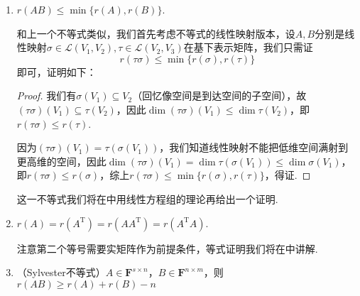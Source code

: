 \begin{enumerate}
\begin{proof}
              下面我们证明$r(A+B)\leqslant r(A)+r(B)$，这里我们站在线性映射的角度证明（接下来第3、5个不等式也是如此，将矩阵的证明转化为线性映射的证明）. 设$A,B$分别是线性映射$\sigma,\tau\in\mathcal{L}(V_1,V_2)$在基下表示矩阵. 事实上，矩阵的秩的定义就来源于线性映射的秩，即$r(A)=r(\sigma)$，$r(B)=r(\tau)$，因此我们只需要证明
              \[r(\sigma+\tau)\leqslant r(\sigma)+r(\tau),\]
              又根据线性映射的秩的定义，只需证明
              \[\dim(\sigma+\tau)(V_1)\leqslant \dim\sigma(V_1)+\dim\tau(V_1),\]
              事实上，$\forall\beta\in(\sigma+\tau)(V_1)$，$\exists\alpha\in V_1$，使得$\beta=(\sigma+\tau)\alpha=\sigma(\alpha)+\tau(\alpha)\in\sigma(V_1)+\tau(V_1)$，因此$(\sigma+\tau)(V_1)\subseteq\sigma(V_1)+\tau(V_1)$，故$\dim(\sigma+\tau)(V_1)\leqslant \dim(\sigma(V_1)+\tau(V_1))\leqslant \dim\sigma(V_1)+\dim\tau(V_1)$，得证（最后一个不等号来源于）.
          \end{proof}

    \item $r(AB) \leqslant \min\{r(A), r(B)\}$.

          和上一个不等式类似，我们首先考虑不等式的线性映射版本，设$A,B$分别是线性映射$\sigma\in\mathcal{L}(V_1,V_2),\tau\in\mathcal{L}(V_2,V_3)$在基下表示矩阵，我们只需证
          \[r(\tau\sigma)\leqslant \min\{r(\sigma), r(\tau)\}\]
          即可，证明如下：

          \begin{proof}
              我们有$\sigma(V_1)\subseteq V_2$（回忆像空间是到达空间的子空间），故$(\tau\sigma)(V_1)\subseteq\tau(V_2)$，因此$\dim(\tau\sigma)(V_1)\leqslant\dim\tau(V_2)$，即$r(\tau\sigma)\leqslant r(\tau)$.

              因为$(\tau\sigma)(V_1)=\tau(\sigma(V_1))$，我们知道线性映射不能把低维空间满射到更高维的空间，因此$\dim(\tau\sigma)(V_1)=\dim\tau(\sigma(V_1))\leqslant\dim\sigma(V_1)$，即$r(\tau\sigma)\leqslant r(\sigma)$，综上$r(\tau\sigma)\leqslant \min\{r(\sigma), r(\tau)\}$，得证.
          \end{proof}

          这一不等式我们将在中用线性方程组的理论再给出一个证明.

    \item $r(A)=r(A^\mathrm{T})=r(AA^\mathrm{T})=r(A^\mathrm{T}A)$.

          注意第二个等号需要实矩阵作为前提条件，等式证明我们将在中讲解.

    \item （Sylvester不等式）$A \in \mathbf{F}^{s \times n}$，$B \in \mathbf{F}^{n \times m}$，则$r(AB) \geqslant r(A)+r(B)-n$


\end{enumerate}
